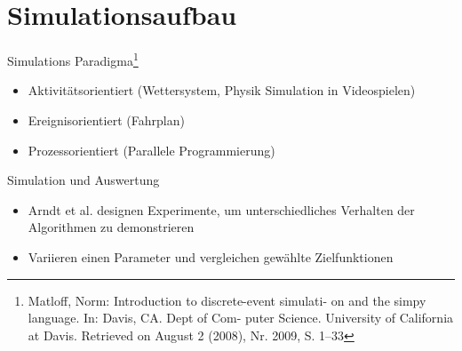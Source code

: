 \documentclass[aspectratio=169,10pt]{beamer}
\begin{document}
\section{Simulationsaufbau}

\begin{frame}[t, fragile]{Simulations Paradigma\footnote{Matloff, Norm: Introduction to discrete-event simulati-
		on and the simpy language. In: Davis, CA. Dept of Com-
		puter Science. University of California at Davis. Retrieved on
		August 2 (2008), Nr. 2009, S. 1–33}}
	\begin{itemize}
		\item Aktivit\"atsorientiert (Wettersystem, Physik Simulation in Videospielen)
		\item \alert{Ereignisorientiert} (Fahrplan)
		\item Prozessorientiert (Parallele Programmierung)
	\end{itemize}
\end{frame}

\begin{frame}[t, fragile]{Simulation und Auswertung}
	\begin{itemize}
		\item Arndt et al. \alert{designen Experimente}, um unterschiedliches Verhalten der Algorithmen zu demonstrieren
		\item Variieren einen Parameter und vergleichen gew\"ahlte Zielfunktionen
	\end{itemize}
\end{frame}
\end{document}

